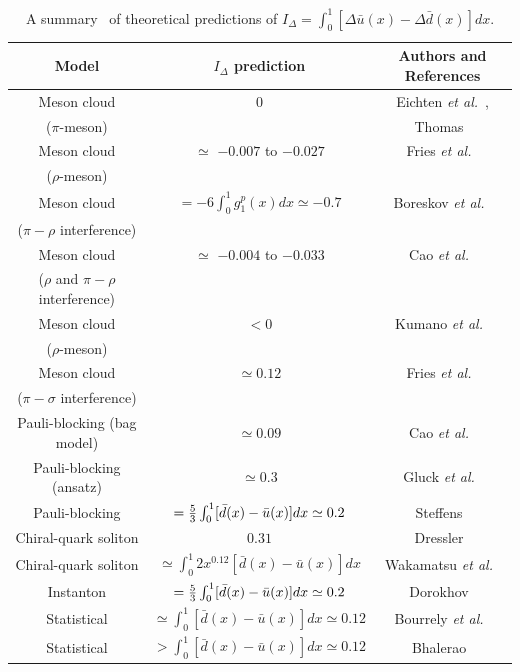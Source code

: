 \begin{table}[htbp]
\begin{center}
\begin{tabular}{ccc}
\hline
     Model                    & $I_\Delta$ prediction & Authors and References \\ \hline
    Meson cloud  &  0                    & Eichten {\it et al.}~\protect\cite{eichten},\\ 
    ($\pi$-meson) &                     &  Thomas~\protect\cite{thomas}\\ 
    Meson cloud  &  $\simeq$ $-0.007$ to $-0.027$ & Fries {\it et al.}~\protect\cite{fries} \\ 
    ($\rho$-meson) &   & \\ 
    Meson cloud  & $ =-6 \int_0^1 g_1^p(x)dx \simeq -0.7 $ & Boreskov {\it et al.}~\protect\cite{Boreskov} \\ 
    ($\pi-\rho$ interference) &                         &  \\ 
    Meson cloud & $\simeq$ $-0.004$ to $-0.033$ & Cao {\it et al.}~\protect\cite{cao} \\ 
    ($\rho$ and $\pi-\rho$ interference) &  &  \\ 
    Meson cloud  &  $< 0$                                          & Kumano {\it et al.}~\protect\cite{Kumano} \\ 
    ($\rho$-meson) &                                            & \\ 
    Meson cloud & $\simeq 0.12$ & Fries {\it et al.}~\protect\cite{fries2} \\ 
    ($\pi-\sigma$ interference) & &  \\ 
    Pauli-blocking (bag model)  & $\simeq 0.09$ & Cao {\it et al.}~\protect\cite{cao} \\ 
    Pauli-blocking (ansatz) & $\simeq 0.3$ & Gluck {\it et al.}~\protect\cite{gluck} \\ 
    Pauli-blocking & $={5 \over 3} \int_0^1 [\bar{d}(x)-\bar{u}(x)]dx \simeq 0.2$ & Steffens~\protect\cite{steffens} \\ 
    Chiral-quark soliton & $0.31$ & Dressler~\protect\cite{dressler} \\ 
    Chiral-quark soliton & $\simeq \int_0^1 2 x^0.12[\bar{d}(x)-\bar{u}(x)]dx$ & Wakamatsu {\it et al.}~\protect\cite{wakamatsu} \\ 
    Instanton & $={5 \over 3} \int_0^1 [\bar{d}(x)-\bar{u}(x)]dx \simeq 0.2$ & Dorokhov~\protect\cite{dorokhov} \\ 
    Statistical & $\simeq  \int_0^1 [\bar{d}(x)-\bar{u}(x)]dx \simeq 0.12$ & Bourrely {\it et al.}~\protect\cite{bbs} \\ 
    Statistical & $ >  \int_0^1 [\bar{d}(x)-\bar{u}(x)]dx \simeq 0.12$ & Bhalerao~\protect\cite{bhalerao} \\ 
\hline
 \end{tabular}
\end{center}
\caption{\label{tab:polubdb}
A summary~\protect\cite{jcpengpol} of theoretical
predictions of $I_\Delta = \int_0^1 [\Delta \bar{u}(x)-\Delta \bar{d}(x)]dx$.}
\end{table}



